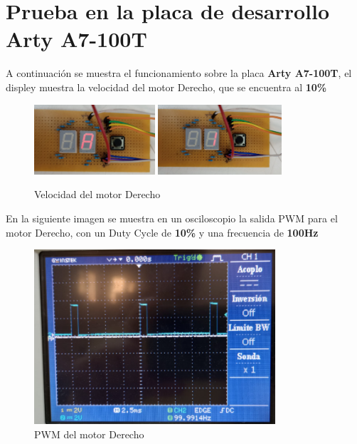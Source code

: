 \documentclass[12pt]{article}
\begin{document}
\section{Prueba en la placa de desarrollo \textbf{Arty A7-100T}}

A continuación se muestra el funcionamiento sobre la placa \textbf{Arty A7-100T}, el displey muestra la velocidad del motor Derecho, que se encuentra al \textbf{10\%}

\begin{figure}[H]
    \centering
    \includegraphics[width=0.4\textwidth]{display-motor-derecho-1}
    \includegraphics[width=0.41\textwidth]{display-motor-derecho-2}
    \caption{Velocidad del motor Derecho}
\end{figure}

En la siguiente imagen se muestra en un osciloscopio la salida PWM para el motor Derecho, con un Duty Cycle de \textbf{10\%} y una frecuencia de \textbf{100Hz}

\begin{figure}[H]
    \centering
    \includegraphics[width=0.8\textwidth]{pwm-motor-derecho-1}
    \caption{PWM del motor Derecho}
\end{figure}
\end{document}
